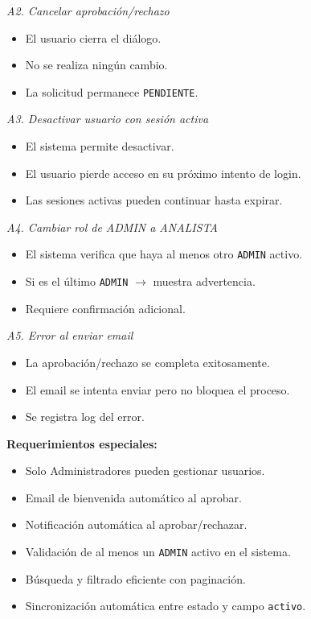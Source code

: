 \vspace{0.3em}
\noindent\textit{A2. Cancelar aprobación/rechazo}
\begin{itemize}[nosep]
    \item El usuario cierra el diálogo.
    \item No se realiza ningún cambio.
    \item La solicitud permanece \texttt{PENDIENTE}.
\end{itemize}

\vspace{0.3em}
\noindent\textit{A3. Desactivar usuario con sesión activa}
\begin{itemize}[nosep]
    \item El sistema permite desactivar.
    \item El usuario pierde acceso en su próximo intento de login.
    \item Las sesiones activas pueden continuar hasta expirar.
\end{itemize}

\vspace{0.3em}
\noindent\textit{A4. Cambiar rol de ADMIN a ANALISTA}
\begin{itemize}[nosep]
    \item El sistema verifica que haya al menos otro \texttt{ADMIN} activo.
    \item Si es el último \texttt{ADMIN} $\rightarrow$ muestra advertencia.
    \item Requiere confirmación adicional.
\end{itemize}

\vspace{0.3em}
\noindent\textit{A5. Error al enviar email}
\begin{itemize}[nosep]
    \item La aprobación/rechazo se completa exitosamente.
    \item El email se intenta enviar pero no bloquea el proceso.
    \item Se registra log del error.
\end{itemize}

\vspace{0.5em}
\noindent\textbf{Requerimientos especiales:}
\begin{itemize}[nosep]
    \item Solo Administradores pueden gestionar usuarios.
    \item Email de bienvenida automático al aprobar.
    \item Notificación automática al aprobar/rechazar.
    \item Validación de al menos un \texttt{ADMIN} activo en el sistema.
    \item Búsqueda y filtrado eficiente con paginación.
    \item Sincronización automática entre estado y campo \texttt{activo}.
\end{itemize}
